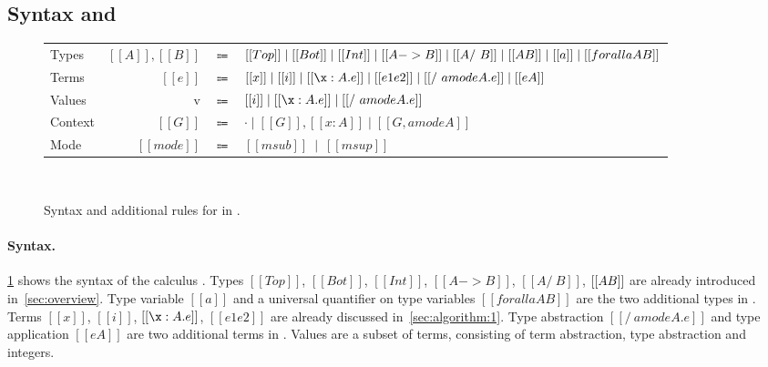 \subsection{Syntax and \nameduo}
\label{sec:system-dkfs:1}

\begin{figure}[t]
  \begin{small}
    \centering
    \begin{tabular}{lrcl} \toprule
      Types & $[[A]], [[B]]$ & $\Coloneqq$ & $ [[Top]] \mid [[Bot]] \mid [[Int]] \mid [[A -> B]] \mid  [[A /\ B]] \mid [[A \/ B]] \mid [[a]] \mid [[forall a A B]] $ \\
      Terms & $[[e]]$ & $\Coloneqq$ & $ [[x]]  \mid [[i]]  \mid [[\x : A . e]] \mid [[e1 e2]] \mid [[/\ a mode A . e]] \mid [[e A]] $ \\
      Values & v & $\Coloneqq$ & $ [[i]]  \mid [[\x : A . e]] \mid [[/\ a mode A . e]] $ \\
      Context & $[[G]]$ & $\Coloneqq$ & $ \cdot  \mid [[G]] , [[x : A]] \mid [[ G , a mode A]] $ \\
      Mode & $[[mode]]$  & $\Coloneqq$ & $[[msub]] \ \mid \ [[msup]]$ \\
      \bottomrule
    \end{tabular}
  \end{small} \\
  \begin{small}
    \centering
  \end{small}
  \caption{Syntax and additional rules for \nameduo in \gfskiu.}
  \label{fig:subtyping:dkfs}
\end{figure}

\paragraph{Syntax.}
\cref{fig:subtyping:dkfs} shows the syntax of the calculus \gfskiu.
Types $[[Top]]$, $[[Bot]]$, $[[Int]]$, $[[A -> B]]$, $[[A /\ B]]$, $[[A \/ B]]$ are already introduced in~\cref{sec:overview}.
Type variable $[[a]]$ and a universal quantifier on type variables
$[[forall a A B]]$ are the two additional types in \gfskiu.
Terms $[[x]]$, $[[i]]$, $[[\x : A . e]]$, $[[e1 e2]]$ are already discussed in~\cref{sec:algorithm:1}.
Type abstraction $[[/\ a mode A . e]]$ and type application $[[e A]]$ are two additional terms in \gfskiu.
Values are a subset of terms, consisting of term abstraction, type abstraction and integers.

